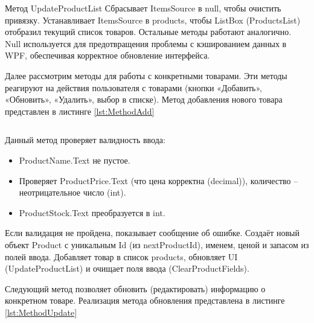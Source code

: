 \documentclass[12pt]{article}
\newcommand{\colorGIT}[1]{\textcolor{CtpLavender}{#1}}
\renewcommand{\texttt}[1]{{\small\ttfamily #1}}
\newenvironment{code}
  {\par\captionsetup{type=listing}\noindent}
  {\par\vspace{\baselineskip}}
\numberwithin{listing}{section}
\numberwithin{figure}{section}
\begin{document}
Метод \texttt{UpdateProductList} Сбрасывает \texttt{ItemsSource} в \texttt{null}, чтобы очистить привязку. Устанавливает \texttt{ItemsSource} в \texttt{products}, чтобы \texttt{ListBox} (\texttt{ProductsList}) отобразил текущий список товаров. Остальные методы работают аналогично. \texttt{Null} используется для предотвращения проблемы с кэшированием данных в \texttt{WPF}, обеспечивая корректное обновление интерфейса.

{}

Далее рассмотрим методы для работы с конкретными товарами. Эти методы реагируют на действия пользователя с товарами (кнопки «Добавить», «Обновить», «Удалить», выбор в списке). Метод добавления нового товара представлен в листинге \ref{lst:MethodAdd}

\begin{code}
	\inputminted[firstline=53, lastline=80]{csharp}{../3lab/StoreManager/MainWindow.xaml.cs}
	\caption{\colorGIT{\href{https://github.com/WebMasterIT/Csharp_Labs/blob/ec375afd16c0647b337cf3d8a79c8bef904fc1be/3lab/StoreManager/MainWindow.xaml.cs\#L53-L80}{Метод}} добавления нового товара}
	\label{lst:MethodAdd}
\end{code}

\noindent Данный метод проверяет валидность ввода:
\begin{itemize}
	\item \texttt{ProductName.Text} не пустое.
	\item Проверяет \texttt{ProductPrice.Text} (что цена корректна (\texttt{decimal})), количество -- неотрицательное число (\texttt{int}).
	\item \texttt{ProductStock.Text} преобразуется в \texttt{int}.
\end{itemize}

Если валидация не пройдена, показывает сообщение об ошибке. Создаёт новый объект \texttt{Product} с уникальным \texttt{Id} (из \texttt{nextProductId}), именем, ценой и запасом из полей ввода. Добавляет товар в список \texttt{products}, обновляет \texttt{UI} (\texttt{Update\-ProductList}) и очищает поля ввода (\texttt{Clear\-ProductFields}).

Следующий метод позволяет обновить (редактировать) информацию о конкретном товаре. Реализация метода обновления представлена в листинге \ref{lst:MethodUpdate}

\begin{code}
	\inputminted[firstline=82, lastline=110]{csharp}{../3lab/StoreManager/MainWindow.xaml.cs}
	\caption{\colorGIT{\href{https://github.com/WebMasterIT/Csharp_Labs/blob/ec375afd16c0647b337cf3d8a79c8bef904fc1be/3lab/StoreManager/MainWindow.xaml.cs\#L82-L110}{Метод}} обновления товара}
	\label{lst:MethodUpdate}
\end{code}
\end{document}
